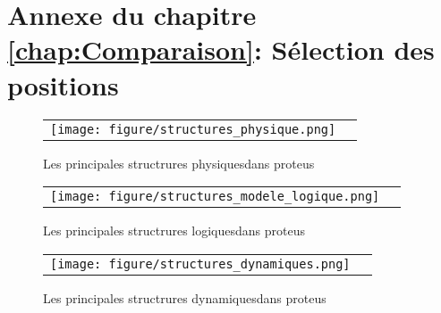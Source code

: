 \chapter*{Annexe du chapitre \ref{chap:Comparaison}: Sélection des positions }
\label{chap:annexeproteus}


   \begin{figure}[!htbp]
     \centering
     \begin{tabular}{cc}
       \texttt{[image: figure/structures\_physique.png]} &
     \end{tabular}
     
     \caption{Les principales structrures \og physiques\fg dans proteus}
\label{graph:struct_Phy}
   \end{figure}



   \begin{figure}[!htbp]
     \centering
     \begin{tabular}{cc}
       \texttt{[image: figure/structures\_modele\_logique.png]} &
     \end{tabular}
     
     \caption{Les principales structrures \og logiques\fg dans proteus}
\label{graph:struct_log}
   \end{figure}



   \begin{figure}[!htbp]
     \centering
     \begin{tabular}{cc}
       \texttt{[image: figure/structures\_dynamiques.png]} &
     \end{tabular}
     
     \caption{Les principales structrures \og dynamiques\fg dans proteus}
\label{graph:struct_Dyna}
   \end{figure}




